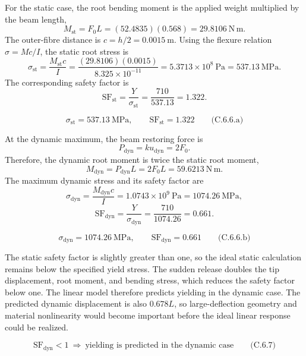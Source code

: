 \par\addvspace{0.35em}
For the static case, the root bending moment is the applied weight multiplied by the beam length,
\[
M_{\mathrm{st}}=F_0L=(52.4835)(0.568)=29.8106\ \mathrm{N\,m}.
\]
The outer-fibre distance is \(c=h/2=0.0015\ \mathrm{m}\). Using the flexure relation \(\sigma=Mc/I\), the static root stress is
\[
\sigma_{\mathrm{st}}
 =\frac{M_{\mathrm{st}}c}{I}
 =\frac{(29.8106)(0.0015)}{8.325\times10^{-11}}
 =5.3713\times10^8\ \mathrm{Pa}
 =537.13\ \mathrm{MPa}.
\]
The corresponding safety factor is
\[
\mathrm{SF}_{\mathrm{st}}
 =\frac{Y}{\sigma_{\mathrm{st}}}
 =\frac{710}{537.13}
 =1.322.
\]

\[
\boxed{\sigma_{\mathrm{st}}=537.13\ \mathrm{MPa},\qquad
\mathrm{SF}_{\mathrm{st}}=1.322}
\qquad\text{(C.6.6.a)}
\]

At the dynamic maximum, the beam restoring force is
\[
P_{\mathrm{dyn}}=ku_{\mathrm{dyn}}=2F_0.
\]
Therefore, the dynamic root moment is twice the static root moment,
\[
M_{\mathrm{dyn}}=P_{\mathrm{dyn}}L=2F_0L=59.6213\ \mathrm{N\,m}.
\]
The maximum dynamic stress and its safety factor are
\[
\sigma_{\mathrm{dyn}}
 =\frac{M_{\mathrm{dyn}}c}{I}
 =1.0743\times10^9\ \mathrm{Pa}
 =1074.26\ \mathrm{MPa},
\]
\[
\mathrm{SF}_{\mathrm{dyn}}
 =\frac{Y}{\sigma_{\mathrm{dyn}}}
 =\frac{710}{1074.26}
 =0.661.
\]

\[
\boxed{\sigma_{\mathrm{dyn}}=1074.26\ \mathrm{MPa},\qquad
\mathrm{SF}_{\mathrm{dyn}}=0.661}
\qquad\text{(C.6.6.b)}
\]

The static safety factor is slightly greater than one, so the ideal static calculation remains below the specified yield stress. The sudden release doubles the tip displacement, root moment, and bending stress, which reduces the safety factor below one. The linear model therefore predicts yielding in the dynamic case. The predicted dynamic displacement is also \(0.678L\), so large-deflection geometry and material nonlinearity would become important before the ideal linear response could be realized.

\[
\boxed{\mathrm{SF}_{\mathrm{dyn}}<1\ \Rightarrow\ \text{yielding is predicted in the dynamic case}}
\qquad\text{(C.6.7)}
\]

\clearpage
{}

